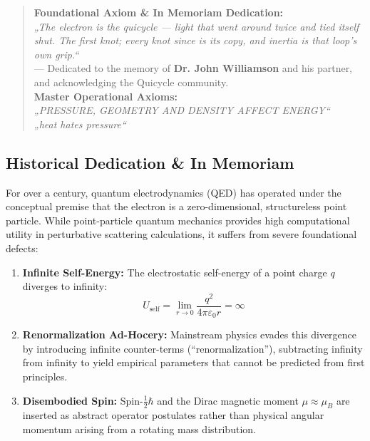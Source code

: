 \documentclass[11pt,a4paper]{article}
\begin{document}
\begin{quote}
\centering
\textbf{Foundational Axiom \& In Memoriam Dedication:}\\
\textit{„The electron is the quicycle --- light that went around twice and tied itself shut. The first knot; every knot since is its copy, and inertia is that loop's own grip.“}\\
\hfill --- Dedicated to the memory of \textbf{Dr. John Williamson} and his partner,\\
and acknowledging the Quicycle community.~\cite{Williamson1997}\\[6pt]
\textbf{Master Operational Axioms:}\\
\textit{„PRESSURE, GEOMETRY AND DENSITY AFFECT ENERGY“}\\
\textit{„heat hates pressure“}
\end{quote}

\subsection{Historical Dedication \& In Memoriam}
\label{subsec:williamson_historical}

For over a century, quantum electrodynamics (QED) has operated under the conceptual premise that the electron is a zero-dimensional, structureless point particle. While point-particle quantum mechanics provides high computational utility in perturbative scattering calculations, it suffers from severe foundational defects:
\begin{enumerate}
    \item \textbf{Infinite Self-Energy:} The electrostatic self-energy of a point charge $q$ diverges to infinity:
    \begin{equation}
    U_{\text{self}} = \lim_{r \to 0} \frac{q^2}{4\pi\varepsilon_0 r} = \infty
    \end{equation}
    \item \textbf{Renormalization Ad-Hocery:} Mainstream physics evades this divergence by introducing infinite counter-terms (``renormalization''), subtracting infinity from infinity to yield empirical parameters that cannot be predicted from first principles.
    \item \textbf{Disembodied Spin:} Spin-$\frac{1}{2}\hbar$ and the Dirac magnetic moment $\mu \approx \mu_B$ are inserted as abstract operator postulates rather than physical angular momentum arising from a rotating mass distribution.
\end{enumerate}
\end{document}
